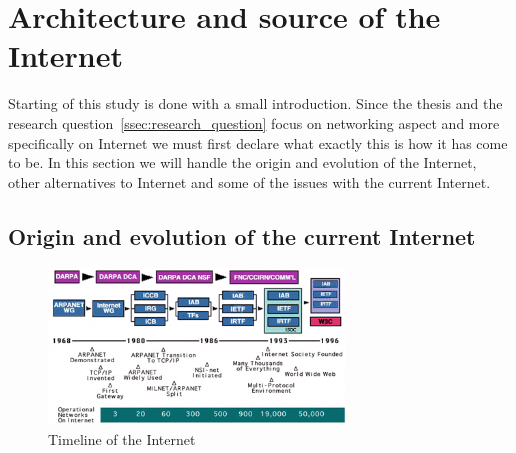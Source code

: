 \section{Architecture and source of the Internet}

Starting of this study is done with a small introduction. Since the thesis and the research question~\ref{ssec:research_question} focus on networking aspect and more specifically on Internet we must first declare what exactly this is how it has come to be. In this section we will handle the origin and evolution of the Internet, other alternatives to Internet and some of the issues with the current Internet. 

\subsection{Origin and evolution of the current Internet}

\begin{figure}[H]
    \centering
    \includegraphics[width=0.7\textwidth]{figures/Internettimeline}
    \caption{Timeline of the Internet \citep{website:Internethistory}} 
    \label{fig:Internettimeline}
\end{figure}
\npar

